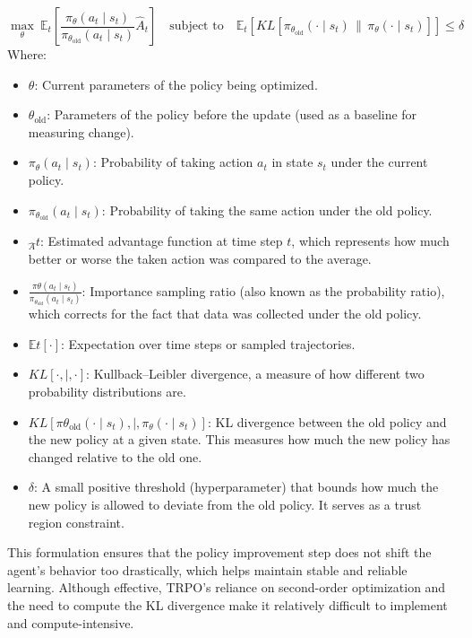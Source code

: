 \documentclass[12pt,oneside,openright,a4paper]{cpe-english-project}
\begin{document}
\begin{equation}
\max_{\theta} \ \mathbb{E}_t \left[ \frac{\pi_{\theta}(a_t \mid s_t)}{\pi_{\theta_{\text{old}}}(a_t \mid s_t)} \hat{A}_t \right] \quad \text{subject to} \quad \mathbb{E}_t \left[ KL\left[ \pi_{\theta_{\text{old}}}(\cdot \mid s_t) \,\|\, \pi_{\theta}(\cdot \mid s_t) \right] \right] \leq \delta
\end{equation}
\newpage
Where:
\begin{itemize}
\item $\theta$: Current parameters of the policy being optimized.
\item $\theta_{\text{old}}$: Parameters of the policy before the update (used as a baseline for measuring change).
\item $\pi_{\theta}(a_t \mid s_t)$: Probability of taking action $a_t$ in state $s_t$ under the current policy.
\item $\pi_{\theta_{\text{old}}}(a_t \mid s_t)$: Probability of taking the same action under the old policy.
\item $\hat{_A}t$: Estimated advantage function at time step $t$, which represents how much better or worse the taken action was compared to the average.
\item $\frac{\pi{\theta}(a_t \mid s_t)}{\pi_{\theta_{\text{old}}}(a_t \mid s_t)}$: Importance sampling ratio (also known as the probability ratio), which corrects for the fact that data was collected under the old policy.
\item $\mathbb{E}t[\cdot]$: Expectation over time steps or sampled trajectories.
\item $KL[\cdot ,|, \cdot]$: Kullback–Leibler divergence, a measure of how different two probability distributions are.
\item $KL\left[ \pi{\theta_{\text{old}}}(\cdot \mid s_t) ,|, \pi_{\theta}(\cdot \mid s_t) \right]$: KL divergence between the old policy and the new policy at a given state. This measures how much the new policy has changed relative to the old one.
\item $\delta$: A small positive threshold (hyperparameter) that bounds how much the new policy is allowed to deviate from the old policy. It serves as a trust region constraint.
\end{itemize}

This formulation ensures that the policy improvement step does not shift the agent's behavior too drastically, which helps maintain stable and reliable learning. Although effective, TRPO's reliance on second-order optimization and the need to compute the KL divergence make it relatively difficult to implement and compute-intensive.
\end{document}

